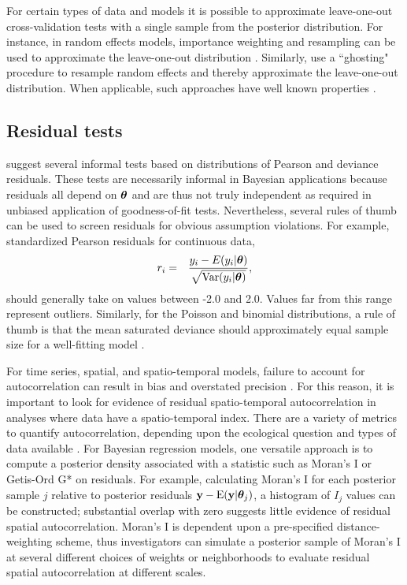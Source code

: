 \documentclass[12pt,english]{article}
\begin{document}
\begin{spacing}{1.9}
For certain types of data and models it is possible to approximate
leave-one-out cross-validation tests with a single sample from the
posterior distribution.  For instance, in random effects models,
importance weighting and resampling can be used to approximate the
leave-one-out distribution
\citep{SternCressie2000,QiuEtAl2016}. Similarly,
\citet{MarshallSpiegelhalter2007} use a ``ghosting" procedure to
resample random effects and thereby approximate the leave-one-out
distribution.  When applicable, such approaches have well known
properties \citep[i.e., a uniform distribution of p-values under the
null;][]{QiuEtAl2016}.

\subsection{Residual tests}

\citet{LunnEtAl2013} suggest several informal tests based on
distributions of Pearson and deviance residuals.  These tests are
necessarily informal in Bayesian applications because residuals all
depend on $\boldsymbol{\theta}$ and are thus not truly independent as required in
unbiased application of goodness-of-fit tests.  Nevertheless, several
rules of thumb can be used to screen residuals for obvious assumption
violations.  For example, standardized Pearson residuals for
continuous data,
\begin{eqnarray*}
  r_i & = & \frac{y_i - E(y_i|\boldsymbol{\theta})}{\sqrt{\textrm{Var}(y_i | \boldsymbol{\theta})}},
\end{eqnarray*}
should generally take on values between -2.0 and 2.0.  Values far
from this range represent outliers.  Similarly, for the Poisson and
binomial distributions, a rule of thumb is that the mean
saturated deviance should approximately equal sample size for a
well-fitting model \citep{LunnEtAl2013}.

For time series, spatial, and spatio-temporal models, failure to
account for autocorrelation can result in bias and overstated
precision \citep{LichsteinEtAl2002}.  For this reason, it is important
to look for evidence of residual spatio-temporal autocorrelation in
analyses where data have a spatio-temporal index.  There are a variety
of metrics to quantify autocorrelation, depending upon the ecological
question and types of data available \cite[e.g.,][]{PerryEtAl2002}.
For Bayesian regression models, one versatile approach is to compute a
posterior density associated with a statistic such as Moran's I
\citep{Moran1950} or Getis-Ord G* \citep{GetisOrd1992} on residuals.
For example, calculating Moran's I for each posterior sample $j$
relative to posterior residuals
${\bf y} - \textrm{E}({\bf y} | \boldsymbol{\theta}_j)$, a histogram
of $I_j$ values can be constructed; substantial overlap with zero
suggests little evidence of residual spatial autocorrelation.  Moran's
I is dependent upon a pre-specified distance-weighting scheme, thus
investigators can simulate a posterior sample of Moran's I at several
different choices of weights or neighborhoods to evaluate residual
spatial autocorrelation at different scales.


\end{spacing}
\end{document}

